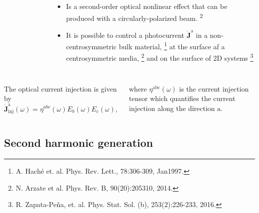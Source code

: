 \documentclass{beamer}
\begin{document}
\begin{frame}
{\begin{columns}
\begin{figure}[h!]
\begin{tikzpicture}
\end{tikzpicture}
\end{figure}



\begin{itemize}

\item 
Is a second-order optical nonlinear effect that can be produced with a
circularly-polarized beam.\textsuperscript{ 2}

\item 
It is possible to control a photocurrent $\mathbf{\dot{J}^{\mathrm{a}}}$ in a 
non-centrosymmetric bulk material,%
\footnote[frame]{\tiny A. Hach\'e et. al. Phys. Rev. Lett., 78:306-309, 
Jan1997.}
at the surface af a centrosymmetric media,%
\footnote[frame]{\tiny N. Arzate et al. Phys. Rev. B, 90(20):205310, 2014.}
and on the surface of 2D systems%
\footnote[frame]{\tiny R. Zapata-Pe\~na, et. al. Phys. Stat. Sol. (b), 
253(2):226-233, 2016.}

\end{itemize}

\end{columns}

\begin{columns}


The optical current injection is given by
\vspace{-1mm}
\begin{equation*}
\mathbf{\dot{J}}^{\mathrm{a}}_{\text{inj}}(\omega) =
\eta^{abc}(\omega)E_{b}(\omega)E_{c}(\omega), \label{eq:current}
\end{equation*}

\vspace{-2mm}
where $\eta^{\mathrm{abc}}(\omega)$ is the current injection tensor which 
quantifies the current injection along the direction $\mathrm{a}$.

\vspace{1mm}
\end{columns}

}

\end{frame}





\subsection{Second harmonic generation}
\end{document}
